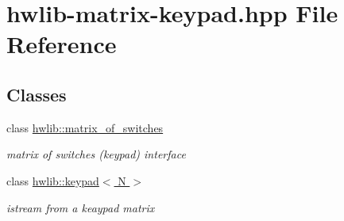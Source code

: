 \hypertarget{hwlib-matrix-keypad_8hpp}{}\section{hwlib-\/matrix-\/keypad.hpp File Reference}
\label{hwlib-matrix-keypad_8hpp}
\subsection*{Classes}
\begin{DoxyCompactItemize}
\item 
class \hyperlink{classhwlib_1_1matrix__of__switches}{hwlib\+::matrix\+\_\+of\+\_\+switches}
\begin{DoxyCompactList}\small\item\em matrix of switches (keypad) interface \end{DoxyCompactList}\item 
class \hyperlink{classhwlib_1_1keypad}{hwlib\+::keypad$<$ N $>$}
\begin{DoxyCompactList}\small\item\em istream from a keaypad matrix \end{DoxyCompactList}\end{DoxyCompactItemize}
